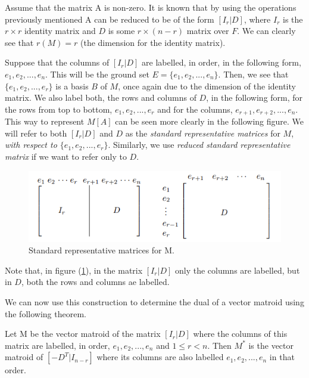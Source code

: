 Assume that the matrix A is non-zero. It is known that by using the operations previously mentioned A can be reduced to be of the form $[I_r|D]$, where $I_r$ is the $r \times r$ identity matrix and $D$ is some $r \times (n-r)$ matrix over $F$. We can clearly see that $r(M)=r$ (the dimension for the identity matrix). 

Suppose that the columns of $[I_r|D]$ are labelled, in order, in the following form, $e_1, e_2,...,e_n$. This will be the ground set $E=\{e_1, e_2,...,e_n\}$. Then, we see that $\{e_1, e_2,...,e_r\}$ is a basis $B$ of $M$, once again due to the dimension of the identity matrix. We also label both, the rows and columns of $D$, in the following form, for the rows from top to bottom, $e_1, e_2,...,e_r$ and for the columns,  $e_{r+1}, e_{r+2},...,e_n$. This way to represent $M[A]$ can be seen more clearly in the following figure. We will refer to both $[I_r|D]$ and $D$ as the \textit{standard representative matrices} for $M$, \textit{with respect to $\{e_1, e_2,...,e_r\}$}. Similarly, we use \textit{reduced standard representative matrix} if we want to refer only to $D$.

\begin{figure}[H]
    \centering
    \includegraphics{SRF.png}
    \caption{Standard representative matrices for M. \cite{oxley1}}
    \label{StandertRepMat}
\end{figure}
Note that, in figure (\ref{StandertRepMat}), in the matrix $[I_r|D]$ only the columns are labelled, but in $D$, both the rows and columns ae labelled.

We can now use this construction to determine the dual of a vector matroid using the following theorem.

\begin{theorem}\label{DualRepMat}
    Let M be the vector matroid of the matrix $[I_r|D]$ where the columns of this matrix are labelled, in order, $e_1, e_2,...,e_n$ and $1\leq r< n$. Then $M^*$ is the vector matroid of $[-D^T|I_{n-r}]$ where its columns are also labelled $e_1, e_2,...,e_n$ in that order.
\end{theorem}

